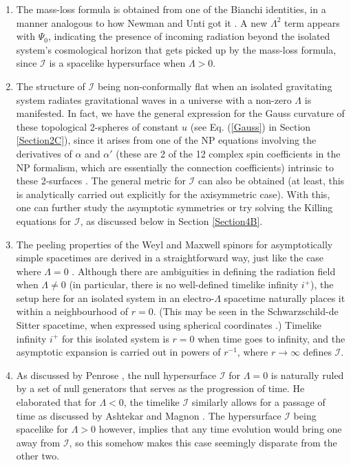\documentclass[aps,pre,preprint,superscriptaddress,showpacs,showkeys]{revtex4-1}
\begin{document}
\begin{enumerate}
\item The mass-loss formula is obtained from one of the Bianchi identities, in a manner analogous to how Newman and Unti got it \cite{newunti62}. A new $\Lambda^2$ term appears with $\Psi_0$, indicating the presence of incoming radiation beyond the isolated system's cosmological horizon that gets picked up by the mass-loss formula, since $\mathcal{I}$ is a spacelike hypersurface when $\Lambda>0$.
\item The structure of $\mathcal{I}$ being non-conformally flat when an isolated gravitating system radiates gravitational waves in a universe with a non-zero $\Lambda$ is manifested. In fact, we have the general expression for the Gauss curvature of these topological 2-spheres of constant $u$ (see Eq. (\ref{Gauss}) in Section \ref{Section2C}), since it arises from one of the NP equations involving the derivatives of $\alpha$ and $\alpha'$ (these are 2 of the 12 complex spin coefficients in the NP formalism, which are essentially the connection coefficients) intrinsic to these 2-surfaces \cite{Pen87}. The general metric for $\mathcal{I}$ can also be obtained (at least, this is analytically carried out explicitly for the axisymmetric case). With this, one can further study the asymptotic symmetries or try solving the Killing equations for $\mathcal{I}$, as discussed below in Section \ref{Section4B}.
\item The peeling properties of the Weyl and Maxwell spinors for asymptotically simple spacetimes are derived in a straightforward way, just like the case where $\Lambda=0$ \cite{newpen62}. Although there are ambiguities in defining the radiation field when $\Lambda\neq0$ \cite{Pen88} (in particular, there is no well-defined timelike infinity $i^+$), the setup here for an isolated system in an electro-$\Lambda$ spacetime naturally places it within a neighbourhood of $r=0$. (This may be seen in the Schwarzschild-de Sitter spacetime, when expressed using spherical coordinates \cite{Vee2016,GP}.) Timelike infinity $i^+$ for this isolated system is $r=0$ when time goes to infinity, and the asymptotic expansion is carried out in powers of $r^{-1}$, where $r\rightarrow\infty$ defines $\mathcal{I}$.
\item As discussed by Penrose \cite{Pen2011}, the null hypersurface $\mathcal{I}$ for $\Lambda=0$ is naturally ruled by a set of null generators that serves as the progression of time. He elaborated that for $\Lambda<0$, the timelike $\mathcal{I}$ similarly allows for a passage of time as discussed by Ashtekar and Magnon \cite{ashmag}. The hypersurface $\mathcal{I}$ being spacelike for $\Lambda>0$ however, implies that any time evolution would bring one away from $\mathcal{I}$, so this somehow makes this case seemingly disparate from the other two.


\end{enumerate}
\end{document}
